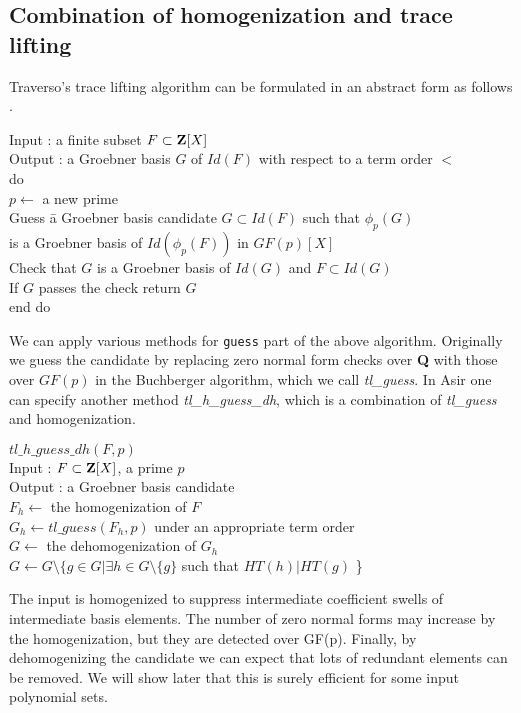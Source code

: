 \documentclass[runningheads]{cl2emult}
\begin{document}
\subsection{Combination of homogenization and trace lifting}

Traverso's trace lifting algorithm can be
formulated in an abstract form as follows \cite{FPARA}.
\begin{tabbing}
Input : a finite subset $F \subset {\bf Z}[X]$\\
Output : a Groebner basis $G$ of $Id(F)$ with respect to a term order $<$\\
do \= \\
\> $p \leftarrow$ a new prime\\
\>Guess \= a Groebner basis candidate $G \subset Id(F)$ 
such that $\phi_p(G)$ \\
\>\> is a Groebner basis of $Id(\phi_p(F))$ in ${GF(p)}[X]$\\
\>Check that $G$ is a Groebner basis of $Id(G)$ and $F \subset Id(G)$\\
\>If $G$ passes the check return $G$\\
end do
\end{tabbing}
We can apply various methods for {\tt guess} part of the above
algorithm.  Originally we guess the candidate by replacing zero normal
form checks over {\bf Q} with those over $GF(p)$ in the Buchberger
algorithm, which we call {\it tl\_guess}. In Asir one can specify
another method {\it tl\_h\_guess\_dh}, which is a combination of
{\it tl\_guess} and homogenization.
\begin{tabbing}
$tl\_h\_guess\_dh(F,p)$\\
Input : $F\subset {\bf Z}[X]$, a prime $p$\\
Output : a Groebner basis candidate\\
$F_h \leftarrow$ the homogenization of $F$\\
$G_h \leftarrow tl\_guess(F_h,p)$ under an appropriate term order\\
$G \leftarrow$ the dehomogenization of $G_h$\\
$G \leftarrow G \setminus \{g \in G| \exists h \in G \setminus \{g\}$
such that $HT(h)|HT(g)$ \}
\end{tabbing}
The input is homogenized to suppress intermediate coefficient swells
of intermediate basis elements.  The number of zero normal forms may
increase by the homogenization, but they are detected over
GF(p). Finally, by dehomogenizing the candidate we can expect that
lots of redundant elements can be removed.  We will show later that this is
surely efficient for some input polynomial sets.
\end{document}
